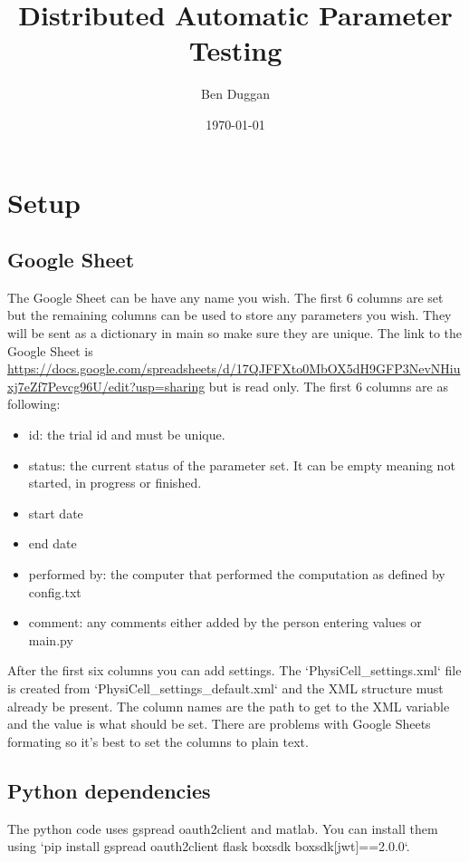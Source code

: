 \documentclass[12pt]{article}
\begin{document}
\title{\vspace{-3cm}Distributed Automatic Parameter Testing}
\author{Ben Duggan}
\date{\today}
\maketitle

\section{Setup}
\subsection{Google Sheet}
The Google Sheet can be have any name you wish.  The first 6 columns are set but the remaining columns can be used to store any parameters you wish.  They will be sent as a dictionary in main so make sure they are unique.  The link to the Google Sheet is \url{https://docs.google.com/spreadsheets/d/17QJFFXto0MbOX5dH9GFP3NevNHiuxj7eZf7Pevcg96U/edit?usp=sharing} but is read only.  The first 6 columns are as following:
\begin{itemize}
	\item id: the trial id and must be unique.
	\item status: the current status of the parameter set.  It can be empty meaning not started, in progress or finished.
	\item start date
	\item end date
	\item performed by: the computer that performed the computation as defined by config.txt
	\item comment: any comments either added by the person entering values or main.py
\end{itemize}
After the first six columns you can add settings.  The `PhysiCell\_settings.xml` file is created from `PhysiCell\_settings\_default.xml` and the XML structure must already be present.  The column names are the path to get to the XML variable and the value is what should be set.  There are problems with Google Sheets formating so it's best to set the columns to plain text.

\subsection{Python dependencies}
The python code uses gspread oauth2client and matlab.  You can install them using `pip install gspread oauth2client flask boxsdk boxsdk[jwt]==2.0.0`.
\end{document}
